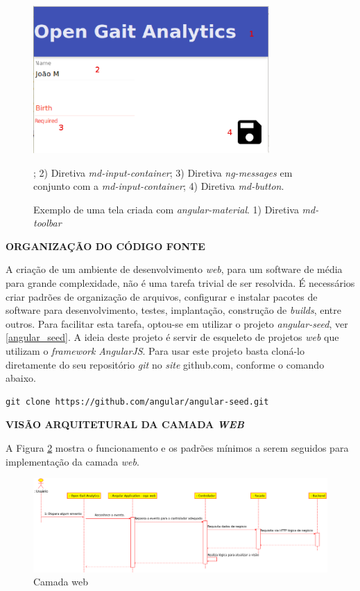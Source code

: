 \begin{figure}[ht]
	\centering
	\includegraphics[width=9cm]{figuras/material_amostra.eps}
	\caption[Exemplo de uma tela criada com \emph{angular-material}.]{Exemplo de uma tela criada com \emph{angular-material}. 1) Diretiva \emph{md-toolbar}}; 2) Diretiva \emph{md-input-container}; 3) Diretiva \emph{ng-messages} em conjunto com a \emph{md-input-container}; 4) Diretiva \emph{md-button}.
	\label{material_amostra}
\end{figure}

\textbf{ORGANIZAÇÃO DO CÓDIGO FONTE}

A criação de um ambiente de desenvolvimento \emph{web}, para um software de média para grande complexidade, não é uma tarefa trivial de ser resolvida.
É necessários criar padrões de organização de arquivos, configurar e instalar pacotes de software para desenvolvimento, testes, implantação, construção de \emph{builds}, entre outros.
Para facilitar esta tarefa, optou-se em utilizar o projeto \emph{angular-seed}, ver \ref{angular_seed}.
A ideia deste projeto é servir de esqueleto de projetos \emph{web} que utilizam o \emph{framework} \emph{AngularJS}.
Para usar este projeto basta cloná-lo diretamente do seu repositório \emph{git} no \emph{site} github.com, conforme o comando abaixo.
\lstset{language=bash}
\begin{lstlisting}[frame=single]
git clone https://github.com/angular/angular-seed.git
\end{lstlisting}

\textbf{VISÃO ARQUITETURAL DA CAMADA \emph{WEB}}

A Figura \ref{camda_web} mostra o funcionamento e os padrões mínimos a serem seguidos para implementação da camada \emph{web}.

\begin{figure}[ht]
	\centering
	\includegraphics[width=17cm]{figuras/camada_web.eps}
	\caption{Camada web}
	\label{camda_web}
\end{figure}

